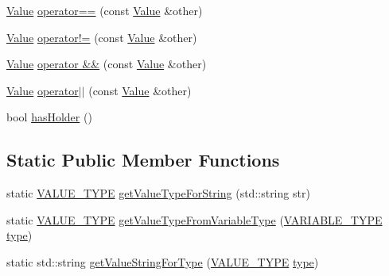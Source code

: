 \begin{DoxyCompactItemize}
\item 
\hyperlink{classValue}{Value} \hyperlink{classValue_a872c51bf32543279f522426527b4c857}{operator==} (const \hyperlink{classValue}{Value} \&other)
\item 
\hyperlink{classValue}{Value} \hyperlink{classValue_a9ad57dde72c068377e6da67caec558a3}{operator!=} (const \hyperlink{classValue}{Value} \&other)
\item 
\hyperlink{classValue}{Value} \hyperlink{classValue_a8550d0a2396c3222421fdd1aef7ff49b}{operator \&\&} (const \hyperlink{classValue}{Value} \&other)
\item 
\hyperlink{classValue}{Value} \hyperlink{classValue_a2bb40009194bb698b113dc71154d888a}{operator$\vert$$\vert$} (const \hyperlink{classValue}{Value} \&other)
\item 
bool \hyperlink{classValue_a9193333ebda6a44b426ebc24519473db}{has\+Holder} ()
\end{DoxyCompactItemize}
\subsection*{Static Public Member Functions}
\begin{DoxyCompactItemize}
\item 
static \hyperlink{statics_8h_a0674a913b8e8c8a9f265baab3646b565}{V\+A\+L\+U\+E\+\_\+\+T\+Y\+PE} \hyperlink{classValue_a4f772a945a39235b058b18cc187f64a8}{get\+Value\+Type\+For\+String} (std\+::string str)
\item 
static \hyperlink{statics_8h_a0674a913b8e8c8a9f265baab3646b565}{V\+A\+L\+U\+E\+\_\+\+T\+Y\+PE} \hyperlink{classValue_a0fcd69a505d407d2cc8e3095499a9516}{get\+Value\+Type\+From\+Variable\+Type} (\hyperlink{statics_8h_a4c85b3a98d55cc0252806c950379cce0}{V\+A\+R\+I\+A\+B\+L\+E\+\_\+\+T\+Y\+PE} \hyperlink{classValue_a4ee4412ce2c7b78bad42d8eb93294bea}{type})
\item 
static std\+::string \hyperlink{classValue_ad1e0a7607c63edbe77251059d433914e}{get\+Value\+String\+For\+Type} (\hyperlink{statics_8h_a0674a913b8e8c8a9f265baab3646b565}{V\+A\+L\+U\+E\+\_\+\+T\+Y\+PE} \hyperlink{classValue_a4ee4412ce2c7b78bad42d8eb93294bea}{type})
\end{DoxyCompactItemize}
